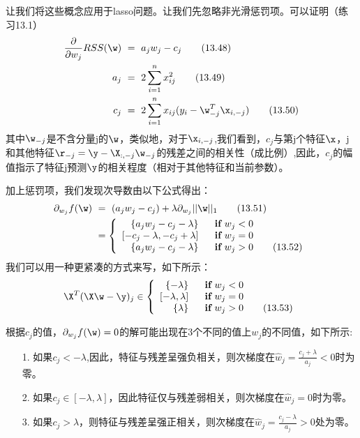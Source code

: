 \documentclass[a4paper]{article}
\begin{document}
让我们将这些概念应用于lasso问题。让我们先忽略非光滑惩罚项。可以证明（练习13.1）
\begin{align}
	\frac{\partial}{\partial w_j}RSS(\w)\ &=\ a_jw_j-c_j\tag{13.48}\\
	a_j\ &=\ 2\sum_{i=1}^{n}x_{ij}^2\tag{13.49}\\
	c_j\ &=\ 2\sum_{i=1}^{n} x_{ij}(y_i-\w_{-j}^T\x_{i,-j})\tag{13.50}
\end{align}
其中$\w_{-j}$是不含分量j的$\w$，类似地，对于$\x_{i,-j}$,我们看到，$c_j$与第j个特征$\x$，j和其他特征$\r_{-j}=\y-\X_{:,-j}\w_{-j}$的残差之间的相关性（成比例）,因此，$c_j$的幅值指示了特征j预测$\y$的相关程度（相对于其他特征和当前参数）。

加上惩罚项，我们发现次导数由以下公式得出：
\begin{align}
	\partial_{w_j}f(\w)\ &=\ (a_j w_j-c_j)+\lambda\partial_{w_j}||\w||_1\tag{13.51}\\
	&=\left\{\begin{array}{rl}
	\{a_jw_j-c_j-\lambda\}& \ \ \textbf{if}\ w_j<0\\
	\left[-c_j-\lambda,-c_j+\lambda \right]&\ \ \textbf{if}\ w_j = 0 \\
	\{a_j w_j-c_j-\lambda\}&\ \ \textbf{if}\ w_j>0\tag{13.52}
	\end{array} \right. 
\end{align}
我们可以用一种更紧凑的方式来写，如下所示：
\begin{equation}
	\X^T(\X \w- \y)_j\in \left\{\begin{array}{rl}
		\{-\lambda\}& \ \ \textbf{if}\ w_j<0\\
	\left[-\lambda,\lambda \right]&\ \ \textbf{if}\ w_j = 0 \\
	\{\lambda\}&\ \ \textbf{if}\ w_j>0\tag{13.53}
	\end{array} \right. 
\end{equation}

根据$c_j$的值，$\partial _{w_j}f(\w)=0$的解可能出现在3个不同的值上$w_j$的不同值，如下所示:
\begin{itemize}
\item[1.] 如果$c_j<-\lambda$,因此，特征与残差呈强负相关，则次梯度在$\hat{w}_j=\frac{c_j+\lambda}{a_j}<0$时为零。
\item[2.]
如果$c_j\in [-\lambda,\lambda]$，因此特征仅与残差弱相关，则次梯度在$\hat{w}_j=0$时为零。
\item[3.]
如果$c_j>\lambda$，则特征与残差呈强正相关，则次梯度在$\hat{w}_j=\frac{c_j-\lambda}{a_j}>0$处为零。
\end{itemize}
\end{document}
